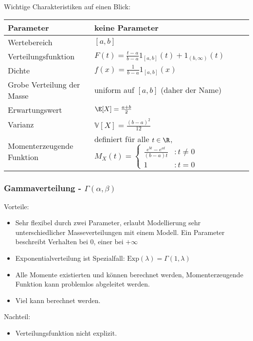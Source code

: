 Wichtige Charakteristiken auf einen Blick:
\begin{center}
\begin{tabular}[h]{|l|l|}
\hline
Parameter& keine Parameter \\
\hline
Wertebereich & $[a,b]$\\
\hline
Verteilungsfunktion & $F(t)= \frac{t-a}{b-a}1_{[a,b]}(t)+1_{(b,\infty)}(t) $\\
\hline
Dichte & $f(x)= \frac{1}{b-a}1_{[a,b]}(x)$\\
\hline
Grobe Verteilung der Masse & uniform auf $[a,b]$ (daher der Name)\\
\hline
Erwartungswert& $\E[X]=\frac{a+b}{2}$ \\
\hline
Varianz & $\mathbb V[X]=\frac{(b-a)^2}{12}$\\
\hline
Momenterzeugende Funktion& definiert f\"ur alle $t\in \R$, $M_X(t)=\begin{cases} \frac{e^{bt}-e^{at}}{(b-a)t}&:t\neq 0\\ 1&:t=0 \end{cases}$\\
\hline
\end{tabular}

\end{center}


\subsubsection*{Gammaverteilung - $\Gamma(\alpha,\beta)$}


{Vorteile:} 
\begin{itemize}
\item Sehr flexibel durch zwei Parameter, erlaubt Modellierung sehr unterschiedlicher Masseverteilungen mit einem Modell. Ein Parameter beschreibt Verhalten bei $0$, einer bei $+\infty$
\item Exponentialverteilung ist Spezialfall: $\text{Exp}(\lambda)=\Gamma(1,\lambda)$
\item Alle Momente existierten und k\"onnen berechnet werden, Momenterzeugende Funktion kann problemlos abgeleitet werden.
\item Viel kann berechnet werden.
\end{itemize}

{Nachteil:}
\begin{itemize}
	\item Verteilungsfunktion nicht explizit.
\end{itemize}

